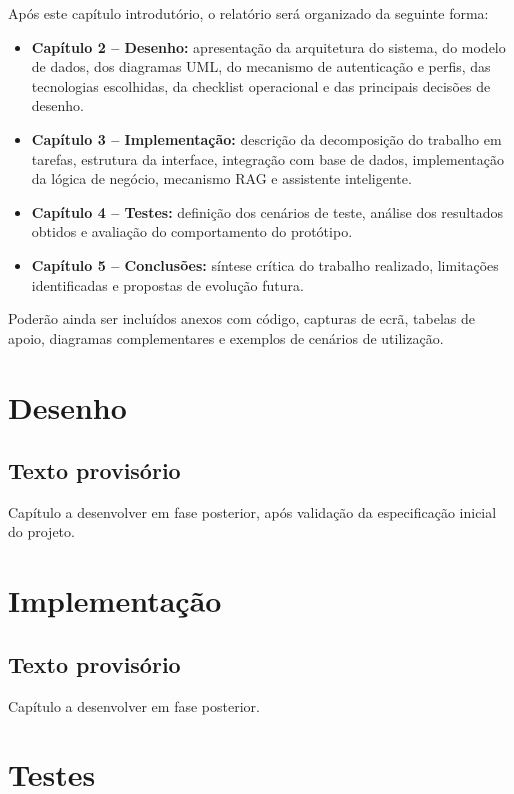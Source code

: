 \documentclass[a4paper,12pt]{report}
\begin{document}
Após este capítulo introdutório, o relatório será organizado da seguinte forma:

\begin{itemize}
    \item \textbf{Capítulo 2 -- Desenho:} apresentação da arquitetura do sistema, do modelo de dados, dos diagramas UML, do mecanismo de autenticação e perfis, das tecnologias escolhidas, da checklist operacional e das principais decisões de desenho.
    \item \textbf{Capítulo 3 -- Implementação:} descrição da decomposição do trabalho em tarefas, estrutura da interface, integração com base de dados, implementação da lógica de negócio, mecanismo RAG e assistente inteligente.
    \item \textbf{Capítulo 4 -- Testes:} definição dos cenários de teste, análise dos resultados obtidos e avaliação do comportamento do protótipo.
    \item \textbf{Capítulo 5 -- Conclusões:} síntese crítica do trabalho realizado, limitações identificadas e propostas de evolução futura.
\end{itemize}

Poderão ainda ser incluídos anexos com código, capturas de ecrã, tabelas de apoio, diagramas complementares e exemplos de cenários de utilização.

\chapter{Desenho}
\section*{Texto provisório}
Capítulo a desenvolver em fase posterior, após validação da especificação inicial do projeto.

\chapter{Implementação}
\section*{Texto provisório}
Capítulo a desenvolver em fase posterior.

\chapter{Testes}
\end{document}
